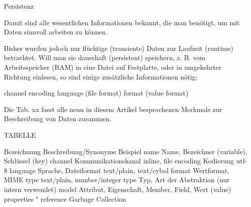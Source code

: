 
Persistenz

Damit sind alle wesentlichen Informationen bekannt, die man benötigt,
um mit Daten sinnvoll arbeiten zu können.

Bisher wurden jedoch nur flüchtige (transiente) Daten zur Laufzeit
(runtime) betrachtet. Will man sie dauerhaft (persistent) speichern,
z. B. vom Arbeitsspeicher (RAM) in eine Datei auf Festplatte,
oder in umgekehrter Richtung einlesen, so sind einige zusätzliche
Informationen nötig:

channel
encoding
language (file format)
format (value format)

Die Tab. xx fasst alle neun in diesem Artikel besprochenen Merkmale
zur Beschreibung von Daten zusammen.

TABELLE

Bezeichnung         Beschreibung/Synonyme                           Beispiel
name                Name, Bezeichner (variable), Schlüssel (key)
channel             Kommunikationskanal                             inline, file
encoding            Kodierung                                       utf-8
language            Sprache, Dateiformat                            text/plain, text/cybol
format              Wertformat, MIME type                           text/plain, number/integer
type                Typ, Art der Abstraktion                        (nur intern verwendet)
model               Attribut, Eigenschaft, Member, Field, Wert (value)
properties          "
reference           Garbage Collection
